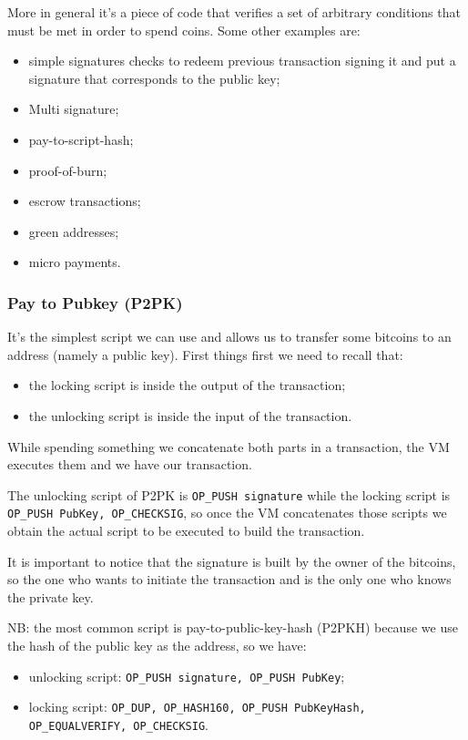 More in general it's a piece of code that verifies a set of arbitrary conditions that must be met in order to spend coins.
Some other examples are:
\begin{itemize}
    \item simple signatures checks to redeem previous transaction signing it and put a signature that corresponds to the public key;
    \item Multi signature;
    \item pay-to-script-hash;
    \item proof-of-burn;
    \item escrow transactions;
    \item green addresses;
    \item micro payments.
\end{itemize}

\subsubsection{Pay to Pubkey (P2PK)}
It's the simplest script we can use and allows us to transfer some bitcoins to an address (namely a public key).
First things first we need to recall that:
\begin{itemize}
    \item the locking script is inside the output of the transaction;
    \item the unlocking script is inside the input of the transaction.
\end{itemize}
While spending something we concatenate both parts in a transaction, the VM executes them and we have our transaction.

The unlocking script of P2PK is \verb|OP_PUSH signature| while the locking script is \\
\verb|OP_PUSH PubKey, OP_CHECKSIG|, so once the VM concatenates those scripts we obtain the actual script to be executed to build the transaction.

It is important to notice that the signature is built by the owner of the bitcoins, so the one who wants to initiate the transaction and is the only one who knows the private key.

NB: the most common script is pay-to-public-key-hash (P2PKH) because we use the hash of the public key as the address, so we have:
\begin{itemize}
    \item unlocking script: \verb|OP_PUSH signature, OP_PUSH PubKey|;
    \item locking script: \verb|OP_DUP, OP_HASH160, OP_PUSH PubKeyHash,| \verb|OP_EQUALVERIFY, OP_CHECKSIG|.
\end{itemize}

